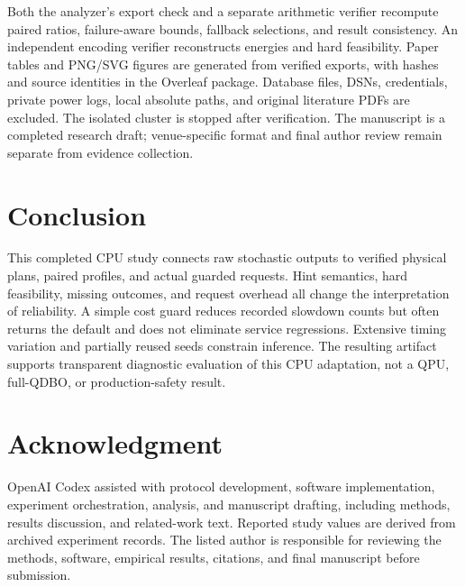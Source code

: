 \documentclass[conference]{IEEEtran}
\begin{document}
Both the analyzer's export check and a separate arithmetic verifier recompute
paired ratios, failure-aware bounds, fallback selections, and result consistency.
An independent encoding verifier reconstructs energies and hard feasibility.
Paper tables and PNG/SVG figures are generated from verified exports, with hashes
and source identities in the Overleaf package. Database files, DSNs, credentials,
private power logs, local absolute paths, and original literature PDFs are excluded.
The isolated cluster is stopped after verification. The manuscript is a completed
research draft; venue-specific format and final author review remain separate
from evidence collection.

\section{Conclusion}
This completed CPU study connects raw stochastic outputs to verified physical
plans, paired profiles, and actual guarded requests. Hint semantics, hard
feasibility, missing outcomes, and request overhead all change the interpretation
of reliability. A simple cost guard reduces recorded slowdown counts but often
returns the default and does not eliminate service regressions. Extensive timing
variation and partially reused seeds constrain inference. The resulting artifact
supports transparent diagnostic evaluation of this CPU adaptation, not a QPU,
full-QDBO, or production-safety result.

\section*{Acknowledgment}
OpenAI Codex assisted with protocol development, software implementation,
experiment orchestration, analysis, and manuscript drafting, including methods,
results discussion, and related-work text. Reported study values are derived
from archived experiment records. The listed author is responsible for reviewing
the methods, software, empirical results, citations, and final manuscript before
submission.



\end{document}
